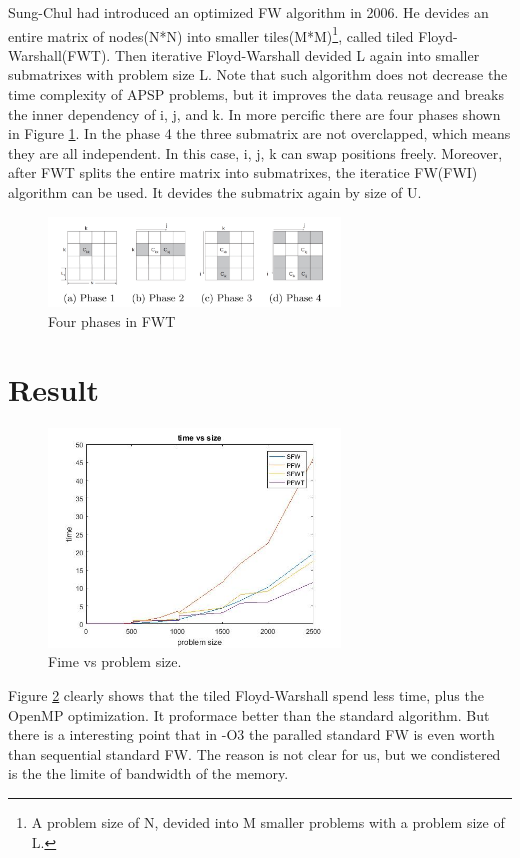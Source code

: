 \documentclass[11pt]{article}
\begin{document}
Sung-Chul had introduced an optimized FW algorithm in 2006\cite{Han:2006:PGA:1152154.1152189}. He devides an entire matrix of nodes(N*N) into smaller tiles(M*M)\footnote{A problem size of N, devided into M smaller problems with a problem size of L.}, called tiled Floyd-Warshall(FWT). Then iterative Floyd-Warshall devided L again into smaller  submatrixes with problem size L. Note that such algorithm does not decrease the time complexity of APSP problems, but it improves the data reusage and breaks the inner dependency of i, j, and k. In more percific there are four phases shown in Figure \ref{fig:phases}. In the phase 4 the three submatrix are not overclapped, which means they are all independent. In this case, i, j, k can swap positions freely. Moreover, after FWT splits the entire matrix into submatrixes, the iteratice FW(FWI) algorithm  can be used. It devides the submatrix again by size of U.
\begin{figure}
\includegraphics[width=3.05in]{FWT_phases}
	\caption{Four phases in FWT\cite{Han:2006:PGA:1152154.1152189}}
    \label{fig:phases}
\end{figure}


\section{Result}

\begin{figure}
\includegraphics[width=3.05in]{plot}
	\caption{Fime vs problem size.\cite{Han:2006:PGA:1152154.1152189}}
    \label{fig:plot}
\end{figure}

Figure \ref{fig:plot} clearly shows that the tiled Floyd-Warshall spend less time, plus the OpenMP optimization. It proformace better than the standard algorithm. But there is a interesting point that in -O3 the paralled standard FW is even worth than sequential standard FW. The reason is not clear for us, but we condistered is the the limite of bandwidth of the memory.
\end{document}
